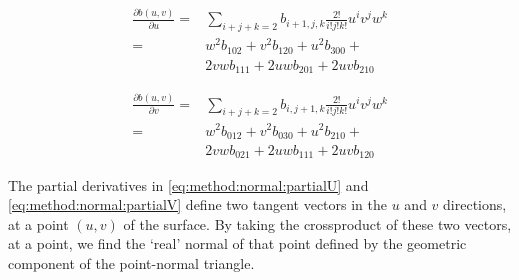 		\begin{align} \label{eq:method:normal:partialU}
			\frac{\partial b(u,v)}{\partial u} ={}& \sum_{i + j + k = 2} b_{i+1, j, k} \frac{2!}{i!j!k!} u^i v^j w^k  \nonumber\\
										   ={}& w^2 b_{102} + v^2 b_{120} + u^2 b_{300} + \\
										    {}& 2 v w b_{111} + 2 u w b_{201} + 2 u v b_{210} \nonumber 
		\end{align}

		\begin{align} \label{eq:method:normal:partialV}
			\frac{\partial b(u,v)}{\partial v} ={}& \sum_{i + j + k = 2} b_{i, j + 1, k} \frac{2!}{i!j!k!}u^i v^j w^k \nonumber \\
											   ={}& w^2 b_{012} + v^2 b_{030} + u^2 b_{210} + \\
											    {}& 2 v w b_{021} + 2 u w b_{111} + 2 u v b_{120} \nonumber
		\end{align}

		The partial derivatives in \eqref{eq:method:normal:partialU} and \eqref{eq:method:normal:partialV} define two tangent vectors in the $u$ and $v$ directions, at a point $(u,v)$ of the surface. By taking the crossproduct of these two vectors, at a point, we find the `real' normal of that point defined by the geometric component of the point-normal triangle.